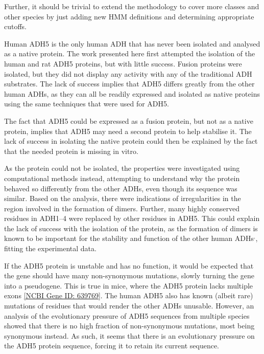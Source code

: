 \documentclass[a4paper, twoside, 12pt, openright]{report}
\begin{document}
Further, it should be trivial to extend the methodology to cover more classes and other species by just adding new HMM definitions and determining appropriate cutoffs. 

Human ADH5 is the only human ADH that has never been isolated and analysed as a native protein. The work presented here first attempted the isolation of the human and rat ADH5 proteins, but with little success. Fusion proteins were isolated, but they did not display any activity with any of the traditional ADH substrates. The lack of success implies that ADH5 differs greatly from the other human ADHs, as they can all be readily expressed and isolated as native proteins using the same techniques\cite{hoog_mammalian_2001-1} that were used for ADH5.

The fact that ADH5 could be expressed as a fusion protein, but not as a native protein, implies that ADH5 may need a second protein to help stabilise it. The lack of success in isolating the native protein could then be explained by the fact that the needed protein is missing in vitro.

As the protein could not be isolated, the properties were investigated using computational methods instead, attempting to understand why the protein behaved so differently from the other ADHs, even though its sequence was similar. Based on the analysis, there were indications of irregularities in the region involved in the formation of dimers. Further, many highly conserved residues in ADH1--4 were replaced by other residues in ADH5. This could explain the lack of success with the isolation of the protein, as the formation of dimers is known to be important for the stability and function of the other human ADHs$^,$\cite{hoog_mammalian_2001-1}, fitting the experimental data.

If the ADH5 protein is unstable and has no function, it would be expected that the gene should have many non-synonymous mutations, slowly turning the gene into a pseudogene. This is true in mice, where the ADH5 protein lacks multiple exons \href{https://www.ncbi.nlm.nih.gov/gene/639769}{[NCBI Gene ID: 639769]}. The human ADH5 also has known (albeit rare) mutations of residues that would render the other ADHs unusable. However, an analysis of the evolutionary pressure of ADH5 sequences from multiple species showed that there is no high fraction of non-synonymous mutations, most being synonymous instead. As such, it seems that there is an evolutionary pressure on the ADH5 protein sequence, forcing it to retain its current sequence.
\end{document}
